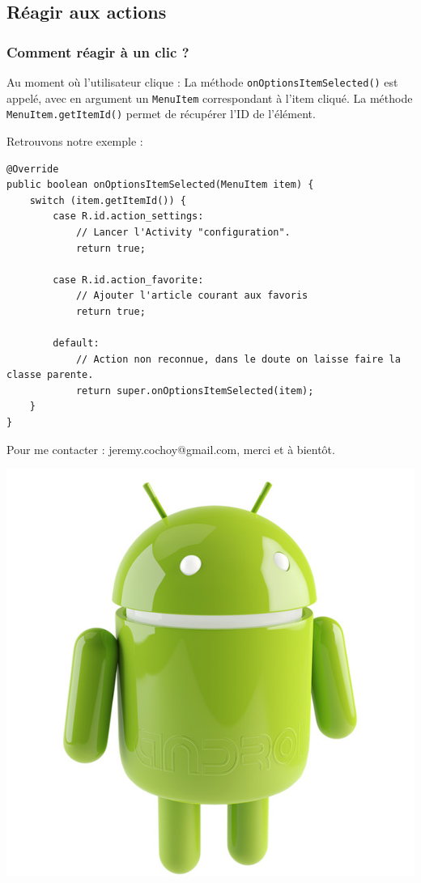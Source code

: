 \documentclass{beamer}
\begin{document}
\subsection{Réagir aux actions}

\begin{frame}
\frametitle{Comment réagir à un clic ?}
\begin{block}{Au moment où l'utilisateur clique :}
La méthode \verb!onOptionsItemSelected()! est appelé, avec en argument un \verb!MenuItem! correspondant à l'item cliqué. La méthode \verb!MenuItem.getItemId()! permet de récupérer l'ID de l'élément.
\end{block}
\end{frame}

\begin{frame}[fragile]
\begin{block}{Retrouvons notre exemple :}
\lstset{language=java}
\begin{lstlisting}
@Override
public boolean onOptionsItemSelected(MenuItem item) {
    switch (item.getItemId()) {
        case R.id.action_settings:
            // Lancer l'Activity "configuration".
            return true;

        case R.id.action_favorite:
            // Ajouter l'article courant aux favoris
            return true;

        default:
            // Action non reconnue, dans le doute on laisse faire la classe parente.
            return super.onOptionsItemSelected(item);
    }
}
\end{lstlisting}
\end{block}

\end{frame}

\begin{frame}
\begin{center}
Pour me contacter : jeremy.cochoy@gmail.com, merci et à bientôt.

\medskip
\medskip
\medskip
\medskip

\includegraphics[scale=0.18]{android.jpg}
\end{center}
\end{frame}
\end{document}
